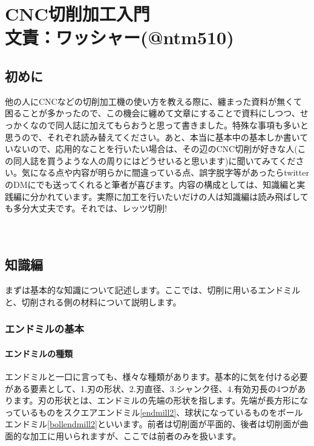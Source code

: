 \documentclass[b5paper, 9pt, twocolumn, titlepage,openany]{jsbook}%
\begin{document}
\part*{CNC切削加工入門\\文責：ワッシャー(@ntm510)}
\chapter*{初めに}
他の人にCNCなどの切削加工機の使い方を教える際に、纏まった資料が無くて困ることが多かったので、この機会に纏めて文章にすることで資料にしつつ、せっかくなので同人誌に加えてもらおうと思って書きました。特殊な事項も多いと思うので、それぞれ読み替えてください。あと、本当に基本中の基本しか書いていないので、応用的なことを行いたい場合は、その辺のCNC切削が好きな人(この同人誌を買うような人の周りにはどうせいると思います)に聞いてみてください。気になる点や内容が明らかに間違っている点、誤字脱字等があったらtwitterのDMにでも送ってくれると筆者が喜びます。内容の構成としては、知識編と実践編に分かれています。実際に加工を行いたいだけの人は知識編は読み飛ばしても多分大丈夫です。それでは、レッツ切削!\\\\\\


\clearpage
\chapter{知識編}

まずは基本的な知識について記述します。ここでは、切削に用いるエンドミルと、切削される側の材料について説明します。\\

\section{エンドミルの基本}

\subsection{エンドミルの種類}
エンドミルと一口に言っても、様々な種類があります。基本的に気を付ける必要がある要素として、1.刃の形状、2.刃直径、3.シャンク径、4.有効刃長の4つがあります。刃の形状とは、エンドミルの先端の形状を指します。先端が長方形になっているものをスクエアエンドミル\ref{endmill2}、球状になっているものをボールエンドミル\ref{bollendmill2}といいます。前者は切削面が平面的、後者は切削面が曲面的な加工に用いられますが、ここでは前者のみを扱います。
\end{document}
